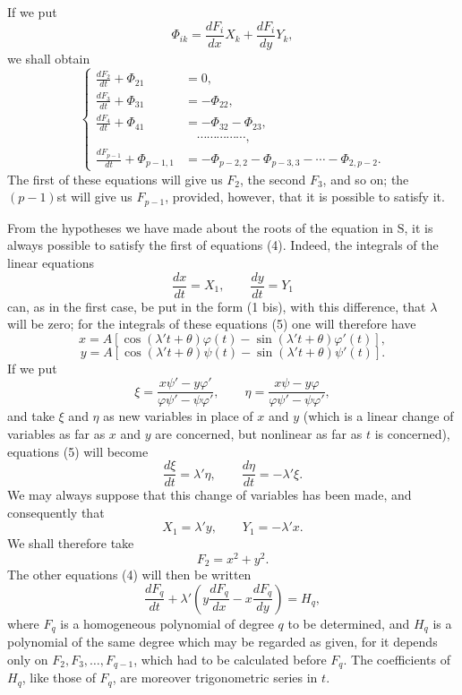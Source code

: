 \documentclass[11pt]{article}
\begin{document}
If we put
\[
\Phi_{ik}=\frac{dF_i}{dx}X_k+\frac{dF_i}{dy}Y_k,
\]
we shall obtain
\begin{equation}
\left\{
\begin{aligned}
\frac{dF_2}{dt}+\Phi_{21}&=0,\\
\frac{dF_3}{dt}+\Phi_{31}&=-\Phi_{22},\\
\frac{dF_4}{dt}+\Phi_{41}&=-\Phi_{32}-\Phi_{23},\\
&\hspace{1em}\cdots\cdots\cdots\cdots\cdots,\\
\frac{dF_{p-1}}{dt}+\Phi_{p-1,1}&=-\Phi_{p-2,2}-\Phi_{p-3,3}-\cdots-\Phi_{2,p-2}.
\end{aligned}
\right.
\tag{4}
\end{equation}
The first of these equations will give us $F_2$, the second $F_3$, and so on; the $(p-1)$st will give us $F_{p-1}$, provided, however, that it is possible to satisfy it.

From the hypotheses we have made about the roots of the equation in $\mathrm{S}$, it is always possible to satisfy the first of equations (4). Indeed, the integrals of the linear equations
\begin{equation}
\frac{dx}{dt}=X_1,
\qquad
\frac{dy}{dt}=Y_1
\tag{5}
\end{equation}
can, as in the first case, be put in the form (1 bis), with this difference, that $\lambda$ will be zero; for the integrals of these equations (5) one will therefore have
\[
x=A\left[\cos(\lambda't+\theta)\varphi(t)-\sin(\lambda't+\theta)\varphi'(t)\right],
\]
\[
y=A\left[\cos(\lambda't+\theta)\psi(t)-\sin(\lambda't+\theta)\psi'(t)\right].
\]
If we put
\[
\xi=\frac{x\psi'-y\varphi'}{\varphi\psi'-\psi\varphi'},
\qquad
\eta=\frac{x\psi-y\varphi}{\varphi\psi'-\psi\varphi'},
\]
and take $\xi$ and $\eta$ as new variables in place of $x$ and $y$ (which is a linear change of variables as far as $x$ and $y$ are concerned, but nonlinear as far as $t$ is concerned), equations (5) will become
\[
\frac{d\xi}{dt}=\lambda'\eta,
\qquad
\frac{d\eta}{dt}=-\lambda'\xi.
\]
We may always suppose that this change of variables has been made, and consequently that
\[
X_1=\lambda'y,
\qquad
Y_1=-\lambda'x.
\]
We shall therefore take
\[
F_2=x^2+y^2.
\]
The other equations (4) will then be written
\begin{equation}
\frac{dF_q}{dt}+\lambda'\left(y\frac{dF_q}{dx}-x\frac{dF_q}{dy}\right)=H_q,
\tag{6}
\end{equation}
where $F_q$ is a homogeneous polynomial of degree $q$ to be determined, and $H_q$ is a polynomial of the same degree which may be regarded as given, for it depends only on $F_2,F_3,\ldots,F_{q-1}$, which had to be calculated before $F_q$. The coefficients of $H_q$, like those of $F_q$, are moreover trigonometric series in $t$.
\end{document}
